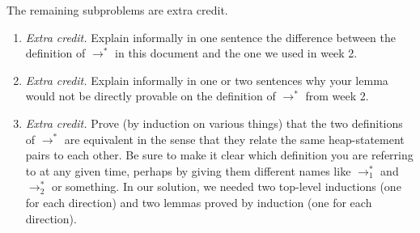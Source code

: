 \documentclass{article}
\theoremstyle{definition}
\begin{document}
\begin{enumerate}[start=1,label={{\bf Problem \arabic*}.},ref=\arabic*,left=0pt..0pt,widest*=10,align=left,itemindent=*]
  The remaining subproblems are extra credit.
  \begin{enumerate}[resume*]
  \item \textit{Extra credit.} Explain informally in one sentence the difference between
    the definition of $\to^*$ in this document and the one we used in week 2.
  \item \textit{Extra credit.} Explain informally in one or two sentences why your lemma
    would not be directly provable on the definition of $\to^*$ from week 2.
  \item \textit{Extra credit.} Prove (by induction on various things) that the
    two definitions of $\to^*$ are equivalent in the sense that they relate the
    same heap-statement pairs to each other. Be sure to make it clear which
    definition you are referring to at any given time, perhaps by giving them
    different names like $\to_1^*$ and $\to^*_2$ or something. In our solution,
    we needed two top-level inductions (one for each direction) and two lemmas
    proved by induction (one for each direction).
  \end{enumerate}
\end{enumerate}
\end{document}
